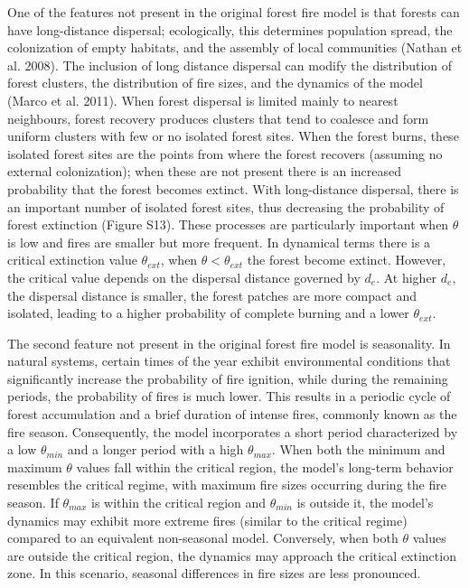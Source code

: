 \documentclass[
]{article}
\begin{document}
One of the features not present in the original forest fire model is
that forests can have long-distance dispersal; ecologically, this
determines population spread, the colonization of empty habitats, and
the assembly of local communities (Nathan et al. 2008). The inclusion of
long distance dispersal can modify the distribution of forest clusters,
the distribution of fire sizes, and the dynamics of the model (Marco et
al. 2011). When forest dispersal is limited mainly to nearest
neighbours, forest recovery produces clusters that tend to coalesce and
form uniform clusters with few or no isolated forest sites. When the
forest burns, these isolated forest sites are the points from where the
forest recovers (assuming no external colonization); when these are not
present there is an increased probability that the forest becomes
extinct. With long-distance dispersal, there is an important number of
isolated forest sites, thus decreasing the probability of forest
extinction (Figure S13). These processes are particularly important when
\(\theta\) is low and fires are smaller but more frequent. In dynamical
terms there is a critical extinction value \(\theta_{ext}\), when
\(\theta < \theta_{ext}\) the forest become extinct. However, the
critical value depends on the dispersal distance governed by \(d_e\). At
higher \(d_e\), the dispersal distance is smaller, the forest patches
are more compact and isolated, leading to a higher probability of
complete burning and a lower \(\theta_{ext}\).

The second feature not present in the original forest fire model is
seasonality. In natural systems, certain times of the year exhibit
environmental conditions that significantly increase the probability of
fire ignition, while during the remaining periods, the probability of
fires is much lower. This results in a periodic cycle of forest
accumulation and a brief duration of intense fires, commonly known as
the fire season. Consequently, the model incorporates a short period
characterized by a low \(\theta_{min}\) and a longer period with a high
\(\theta_{max}\). When both the minimum and maximum \(\theta\) values
fall within the critical region, the model's long-term behavior
resembles the critical regime, with maximum fire sizes occurring during
the fire season. If \(\theta_{max}\) is within the critical region and
\(\theta_{min}\) is outside it, the model's dynamics may exhibit more
extreme fires (similar to the critical regime) compared to an equivalent
non-seasonal model. Conversely, when both \(\theta\) values are outside
the critical region, the dynamics may approach the critical extinction
zone. In this scenario, seasonal differences in fire sizes are less
pronounced.
\end{document}
